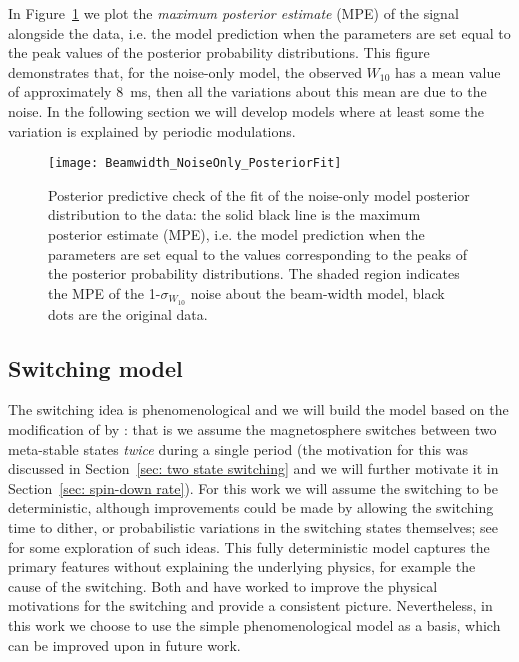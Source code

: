 \documentclass[../full_thesis/full_thesis.tex]{subfiles}
\begin{document}
In Figure~\ref{fig: noise-only beam-width posterior fit} we plot the
\emph{maximum posterior estimate} (MPE) of the signal alongside the data, i.e.
the model prediction when the parameters are set equal to the peak values of
the posterior probability distributions.  This figure demonstrates that, for
the noise-only model, the observed $W_{10}$ has a mean value of approximately
$8$~ms, then all the variations about this mean are due to the noise. In the
following section we will develop models where at least some the variation is
explained by periodic modulations.
\begin{figure}
\centering
\texttt{[image: Beamwidth\_NoiseOnly\_PosteriorFit]}
\caption{Posterior predictive check of the fit of the noise-only model
posterior distribution to the data: the solid black line is the maximum
posterior estimate (MPE), i.e. the model prediction when the parameters are set
equal to the values corresponding to the peaks of the posterior probability
distributions.   The shaded region indicates the MPE of the 1-$\sigma_{W_{10}}$
noise about the beam-width model, black dots are the original data.}
\label{fig: noise-only beam-width posterior fit}
\end{figure}

\subsection{Switching model}
\label{sec: switching}

The switching idea is phenomenological and we will build the model based on the
modification of \citet{Lyne2010} by \citet{Perera2015}: that is we assume the
magnetosphere switches between two meta-stable states \emph{twice} during a
single period (the motivation for this was discussed in Section~\ref{sec: two state switching}
and we will further motivate it in Section~\ref{sec: spin-down
rate}). For this work we will assume the switching to be deterministic,
although improvements could be made by allowing the switching time to dither,
or probabilistic variations in the switching states themselves; see
\citet{Lyne2010} for some exploration of such ideas. This fully deterministic
model captures the primary features without explaining the underlying physics,
for example the cause of the switching.  Both \citet{Jones2012} and
\citet{Cordes2013} have worked to improve the physical motivations for the
switching and provide a consistent picture. Nevertheless, in this work we
choose to use the simple phenomenological model as a basis, which can be
improved upon in future work.
\end{document}
